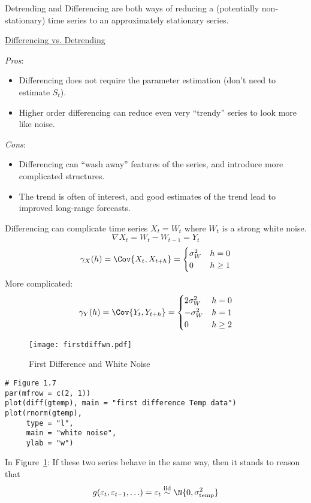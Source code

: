 Detrending and Differencing are both ways of reducing a
(potentially non-stationary) time series
to an approximately stationary series.

\underline{Differencing vs. Detrending}

\emph{Pros}:
\begin{itemize}
    \item Differencing does not require the parameter estimation
          (don't need to estimate $ S_t $).
    \item Higher order differencing can reduce even very
          ``trendy'' series to look more like noise.
\end{itemize}
\emph{Cons}:
\begin{itemize}
    \item Differencing can ``wash away'' features of the series,
          and introduce more complicated structures.
    \item The trend is often of interest, and good estimates
          of the trend lead to improved long-range forecasts.
\end{itemize}
\begin{Example}{Differencing can complicate time series}{}
    $ X_t=W_t $ where $ W_t $ is a strong white noise.
    \[ \nabla X_t=W_t-W_{t-1}=Y_t \]
    \[ \gamma_X(h)=\Cov{X_t,X_{t+h}}=\begin{cases}
            \sigma_W^2 & h=0    \\
            0          & h\ge 1
        \end{cases} \]
    More complicated:
    \[ \gamma_Y(h)=\Cov{Y_t,Y_{t+h}}=\begin{cases}
            2\sigma_W^2 & h=0    \\
            -\sigma_W^2 & h=1    \\
            0           & h\ge 2
        \end{cases} \]
\end{Example}
\begin{figure}[!ht]
    \centering
    \texttt{[image: firstdiffwn.pdf]}
    \caption{First Difference and White Noise}\label{fig:firstdiffwn}
\end{figure}
\begin{verbatim}
# Figure 1.7
par(mfrow = c(2, 1))
plot(diff(gtemp), main = "first difference Temp data")
plot(rnorm(gtemp),
     type = "l",
     main = "white noise",
     ylab = "w")    
\end{verbatim}
In Figure~\ref{fig:firstdiffwn}: If these two series behave in
the same way, then it stands to reason that
\[ g(\varepsilon_t,\varepsilon_{t-1},\ldots)=\varepsilon_t
    \stackrel{\text{iid}}{\sim}\N{0,\sigma^2_{\text{temp}}} \]
